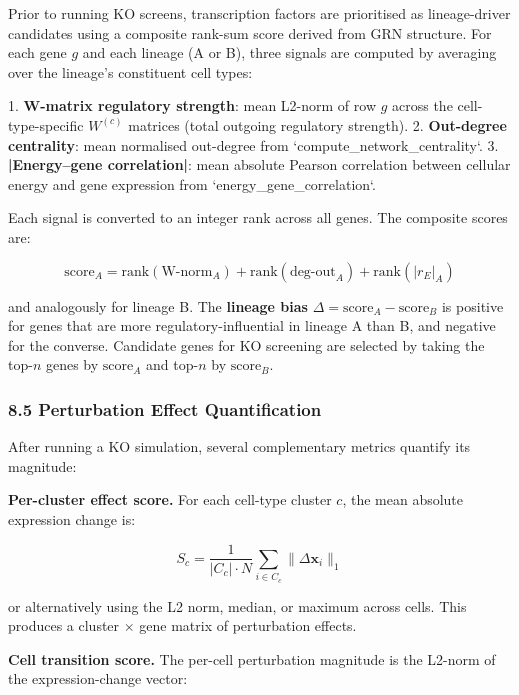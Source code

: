\documentclass[11pt]{article}
\begin{document}
Prior to running KO screens, transcription factors are prioritised as lineage-driver candidates using a composite rank-sum score derived from GRN structure. For each gene $g$ and each lineage (A or B), three signals are computed by averaging over the lineage's constituent cell types:

1. \textbf{W-matrix regulatory strength}: mean L2-norm of row $g$ across the cell-type-specific $W^{(c)}$ matrices (total outgoing regulatory strength).
2. \textbf{Out-degree centrality}: mean normalised out-degree from `compute\_network\_centrality`.
3. \textbf{|Energy--gene correlation|}: mean absolute Pearson correlation between cellular energy and gene expression from `energy\_gene\_correlation`.

Each signal is converted to an integer rank across all genes. The composite scores are:

\begin{equation}
\text{score}_A = \mathrm{rank}(\text{W-norm}_A) + \mathrm{rank}(\text{deg-out}_A) + \mathrm{rank}(|r_E|_A)
\end{equation}

and analogously for lineage B. The \textbf{lineage bias} $\Delta = \text{score}_A - \text{score}_B$ is positive for genes that are more regulatory-influential in lineage A than B, and negative for the converse. Candidate genes for KO screening are selected by taking the top-$n$ genes by $\text{score}_A$ and top-$n$ by $\text{score}_B$.


\subsubsection*{8.5 Perturbation Effect Quantification}

After running a KO simulation, several complementary metrics quantify its magnitude:

\textbf{Per-cluster effect score.} For each cell-type cluster $c$, the mean absolute expression change is:

\begin{equation}
S_c = \frac{1}{|C_c| \cdot N} \sum_{i \in C_c} \|\Delta\mathbf{x}_i\|_1
\end{equation}

or alternatively using the L2 norm, median, or maximum across cells. This produces a cluster $\times$ gene matrix of perturbation effects.

\textbf{Cell transition score.} The per-cell perturbation magnitude is the L2-norm of the expression-change vector:
\end{document}
